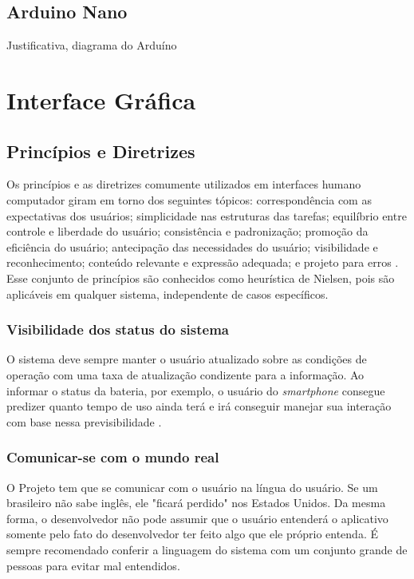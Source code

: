 \subsection{Arduino Nano}

Justificativa, diagrama do Arduíno

\section{Interface Gráfica}

\subsection{Princípios e Diretrizes}

Os princípios e as diretrizes comumente utilizados em interfaces humano computador giram em torno dos seguintes tópicos: correspondência com as expectativas dos usuários; simplicidade nas estruturas das tarefas; equilíbrio entre controle e liberdade do usuário; consistência e padronização; promoção da eficiência do usuário; antecipação das necessidades do usuário; visibilidade e reconhecimento; conteúdo relevante e expressão adequada; e projeto para erros \cite{BarbosaEtAl2021InteracaoHumanoComputadorExperiencia}.
Esse conjunto de princípios são conhecidos como heurística de Nielsen, pois são aplicáveis em qualquer sistema, independente de casos específicos.

\subsubsection{Visibilidade dos status do sistema}

O sistema deve sempre manter o usuário atualizado sobre as condições de operação com uma taxa de atualização condizente para a informação. Ao informar o status da bateria, por exemplo, o usuário do \textit{smartphone} consegue predizer quanto tempo de uso ainda terá e irá conseguir manejar sua interação com base nessa previsibilidade \cite{site:nielsen}.

\subsubsection{Comunicar-se com o mundo real}
O Projeto tem que se comunicar com o usuário na língua do usuário. Se um brasileiro não sabe inglês, ele "ficará perdido" nos Estados Unidos. Da mesma forma, o desenvolvedor não pode assumir que o usuário entenderá o aplicativo somente pelo fato do desenvolvedor ter feito algo que ele próprio entenda. É sempre recomendado conferir a linguagem do sistema com um conjunto grande de pessoas para evitar mal entendidos.

